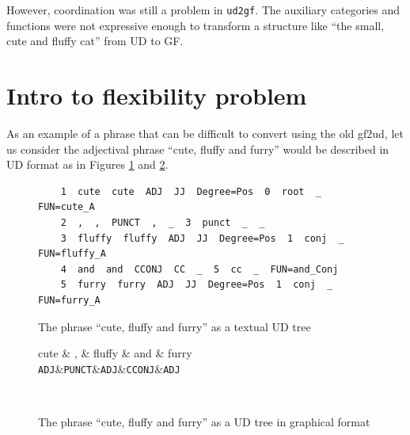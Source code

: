 However, coordination was still a problem in \verb|ud2gf|. The auxiliary categories and functions were not expressive enough to transform a structure like ``the small, cute and fluffy cat'' from UD to GF.





\section{Intro to flexibility problem}

As an example of a phrase that can be difficult to convert using the old gf2ud, let us consider the adjectival phrase ``cute, fluffy and furry''
would be described in UD format as in Figures \ref{fig:ud_cute_text} and \ref{fig:ud_cute}.


\begin{figure}
    \begin{verbatim}
    1  cute  cute  ADJ  JJ  Degree=Pos  0  root  _  FUN=cute_A
    2  ,  ,  PUNCT  ,  _  3  punct  _  _
    3  fluffy  fluffy  ADJ  JJ  Degree=Pos  1  conj  _  FUN=fluffy_A
    4  and  and  CCONJ  CC  _  5  cc  _  FUN=and_Conj
    5  furry  furry  ADJ  JJ  Degree=Pos  1  conj  _  FUN=furry_A
    \end{verbatim}
    \caption{The phrase ``cute, fluffy and furry'' as a textual UD tree}
    \label{fig:ud_cute_text}
\end{figure}

\begin{figure}
    \centering
    \begin{dependency}
        \begin{deptext}[column sep=0.4cm]
              cute \& , \& fluffy \& and \& furry \\
            {\tt ADJ}\&{\tt PUNCT}\&{\tt ADJ}\&{\tt CCONJ}\&{\tt ADJ}\\
        \end{deptext}
    \end{dependency} \\
    \caption{The phrase ``cute, fluffy and furry'' as a UD tree in graphical format}
    \label{fig:ud_cute}
\end{figure}
% 

